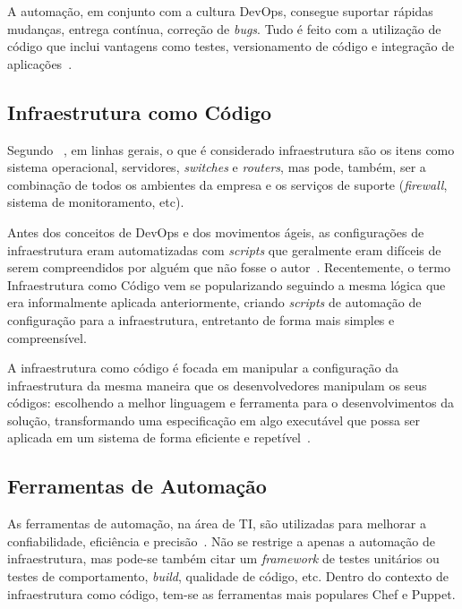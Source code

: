 A automação, em conjunto com a cultura DevOps, consegue suportar rápidas mudanças,
entrega contínua, correção de \textit{bugs}. Tudo é feito com a utilização de
código que inclui vantagens como testes, versionamento de código e
integração de aplicações~\cite{sharma:2015}.

\subsection{Infraestrutura como Código}

Segundo ~, em linhas gerais, o que é considerado
infraestrutura são os itens como sistema operacional, servidores,
\textit{switches} e \textit{routers}, mas pode, também, ser a combinação
de todos os ambientes da empresa e os serviços de suporte (\textit{firewall},
sistema de monitoramento, etc).

Antes dos conceitos de DevOps e dos movimentos ágeis, as configurações de
infraestrutura eram automatizadas com \textit{scripts} que geralmente eram
difíceis de serem compreendidos por alguém que não fosse o autor~\cite{huttermann:2012}.
Recentemente, o termo Infraestrutura como Código vem se popularizando
seguindo a mesma lógica que era informalmente aplicada anteriormente, criando
\textit{scripts} de automação de configuração para a infraestrutura, entretanto de forma
mais simples e compreensível.

A infraestrutura como código é focada em manipular a configuração da infraestrutura
da mesma maneira que os desenvolvedores manipulam os seus códigos: escolhendo a melhor
linguagem e ferramenta para o desenvolvimentos da solução, transformando uma especificação
em algo executável que possa ser aplicada em um sistema de forma eficiente e
repetível~\cite{huttermann:2012}.


\subsection{Ferramentas de Automação}
\label{sec:ferramenta_automacao}

As ferramentas de automação, na área de TI, são utilizadas para melhorar
a confiabilidade, eficiência e precisão~\cite{sharma:2015}. Não se restrige a
apenas a automação de infraestrutura, mas pode-se também citar um \textit{framework}
de testes unitários ou testes de comportamento, \textit{build}, qualidade de código, etc.
Dentro do contexto de infraestrutura como código, tem-se as ferramentas
mais populares Chef e Puppet.


